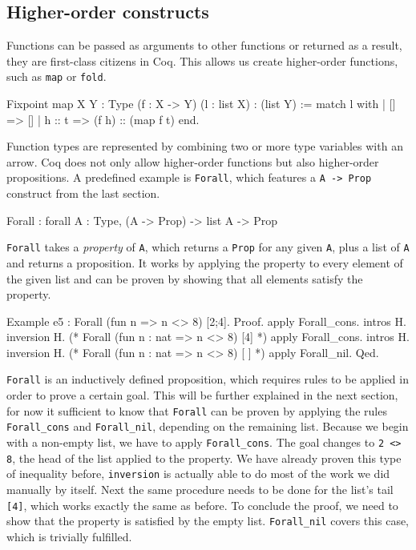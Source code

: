 \documentclass[fleqn, abstract=on]{scrreprt}
\newcommand{\todo}[1]{\marginpar{\textbf{TODO:} #1}}
\newcommand{\coqinline}[1]{\texttt{#1}}
\begin{document}
\subsection{Higher-order constructs}
Functions can be passed as arguments to other functions or returned as a result, they are first-class citizens in Coq. This allows us create higher-order functions, such as \coqinline{map} or \coqinline{fold}.
\todo{minted bug?}
\begin{coqcode}
Fixpoint map {X Y : Type} (f : X -> Y) (l : list X) : (list Y) :=
  match l with
  | []     => []
  | h :: t => (f h) :: (map f t)
  end.
\end{coqcode}
Function types are represented by combining two or more type variables with an arrow. Coq does not only allow higher-order functions but also higher-order propositions. A predefined example is \coqinline{Forall}, which features a \coqinline{A -> Prop} construct from the last section.
\begin{coqcode}
Forall : forall A : Type, (A -> Prop) -> list A -> Prop
\end{coqcode}
\coqinline{Forall} takes a \textit{property} of \coqinline{A}, which returns a \coqinline{Prop} for any given \coqinline{A}, plus a list of \coqinline{A} and returns a proposition. It works by applying the property to every element of the given list and can be proven by showing that all elements satisfy the property.
\begin{coqcode}
Example e5 : Forall (fun n => n <> 8) [2;4].
Proof.
apply Forall_cons. intros H. inversion H.
(* Forall (fun n : nat => n <> 8) [4] *)
apply Forall_cons. intros H. inversion H.
(* Forall (fun n : nat => n <> 8) [ ] *)
apply Forall_nil.
Qed.
\end{coqcode}
\coqinline{Forall} is an inductively defined proposition, which requires rules to be applied in order to prove a certain goal. This will be further explained in the next section, for now it sufficient to know that \coqinline{Forall} can be proven by applying the rules \coqinline{Forall_cons} and \coqinline{Forall_nil}, depending on the remaining list. Because we begin with a non-empty list, we have to apply \coqinline{Forall_cons}. The goal changes to \coqinline{2 <> 8}, the head of the list applied to the property. We have already proven this type of inequality before, \coqinline{inversion} is actually able to do most of the work we did manually by itself. Next the same procedure needs to be done for the list's tail \coqinline{[4]}, which works exactly the same as before. To conclude the proof, we need to show that the property is satisfied by the empty list. \coqinline{Forall_nil} covers this case, which is trivially fulfilled.
\end{document}
